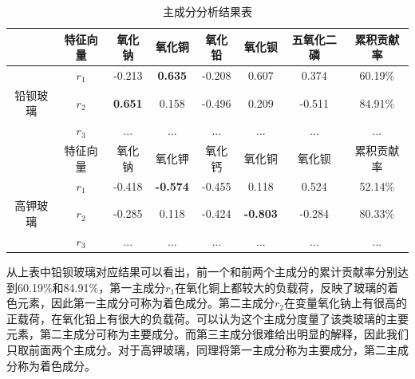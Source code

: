 \documentclass[withoutpreface,bwprint]{cumcmthesis} %
\begin{document}
\begin{table}[H]
  \caption{主成分分析结果表}
  \centering
  \begin{tabular}{cccccccc}
    \toprule[1.5pt]
           & 特征向量 & 氧化钠    & 氧化铜    & 氧化铅    & 氧化钡    & 五氧化二磷  & 累积贡献率   \\ \hline
           & $r_1$   & -0.213 & \textbf{0.635}  & -0.208 & 0.607  & 0.374  & 60.19\% \\
           铅钡玻璃 & $r_2$   & \textbf{0.651}  & 0.158  & -0.496 & 0.209  & -0.511 & 84.91\% \\
           & $r_3$   & ...    & ...    & ...    & ...    & ...    & ...     \\
           & 特征向量 & 氧化钠    & 氧化钾    & 氧化钙    & 氧化铜    & 氧化钡    & 累积贡献率   \\
           & $r_1$   & -0.418 & \textbf{-0.574} & -0.455 & 0.118  & 0.524  & 52.14\% \\
           高钾玻璃 & $r_2$   & -0.285 & 0.118  & -0.424 & \textbf{-0.803} & -0.284 & 80.33\% \\
           & $r_3$   & ...    & ...    & ...    & ...    & ...    & ...     \\ \bottomrule[1.5pt]
  \end{tabular}
\end{table}

从上表中铅钡玻璃对应结果可以看出，前一个和前两个主成分的累计贡献率分别达到60.19$\%$和84.91$\%$，第一主成分$r_1$在氧化铜上都较大的负载荷，反映了玻璃的着色元素，因此第一主成分可称为着色成分。第二主成分$r_2$在变量氧化钠上有很高的正载荷，在氧化铅上有很大的负载荷。可以认为这个主成分度量了该类玻璃的主要元素，第二主成分可称为主要成分。而第三主成分很难给出明显的解释，因此我们只取前面两个主成分。对于高钾玻璃，同理将第一主成分称为主要成分，第二主成分称为着色成分。
\end{document}
